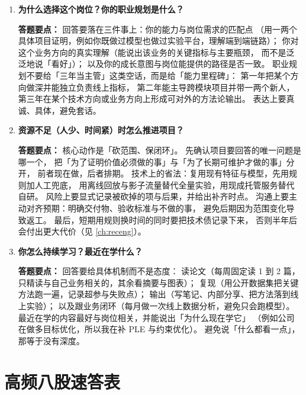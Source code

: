 \begin{interview}[题库与答题要点]
\begin{enumerate}[label=]
  \item[\textcolor{VioletDeep}{\textbf{Q142.}}] \textbf{为什么选择这个岗位？你的职业规划是什么？}
\par\smallskip\noindent\textcolor{VioletDeep}{\textbf{答题要点：}}
回答要落在三件事上：你的能力与岗位需求的匹配点
（用一两个具体项目证明，例如你既做过模型也做过实验平台，理解端到端链路）；
你对这个业务方向的真实理解（能说出该业务的关键指标与主要瓶颈，
而不是泛泛地说「看好」）；
以及你的成长意图与岗位能提供的路径是否一致。
职业规划不要给「三年当主管」这类空话，而是给「能力里程碑」：
第一年把某个方向做深并能独立负责线上指标，
第二年能主导跨模块项目并带一两个新人，
第三年在某个技术方向或业务方向上形成可对外的方法论输出。
表达上要真诚、具体，避免套话。

  \item[\textcolor{VioletDeep}{\textbf{Q143.}}] \textbf{资源不足（人少、时间紧）时怎么推进项目？}
\par\smallskip\noindent\textcolor{VioletDeep}{\textbf{答题要点：}}
核心动作是「砍范围、保闭环」。
先确认项目要回答的唯一问题是哪一个，
把「为了证明价值必须做的事」与「为了长期可维护才做的事」分开，
前者现在做，后者排期。
技术上的省法：复用现有特征与模型，先用规则加人工兜底，
用离线回放与影子流量替代全量实验，用现成托管服务替代自研。
风险上要显式记录被砍掉的项与后果，并给出补齐时点。
沟通上要主动对齐预期：明确交付物、验收标准与不做的事，
避免后期因为范围变化导致返工。
最后，短期用规则换时间的同时要把技术债记录下来，
否则半年后会付出更大代价（见 \cref{ch:receng}）。

  \item[\textcolor{VioletDeep}{\textbf{Q144.}}] \textbf{你怎么持续学习？最近在学什么？}
\par\smallskip\noindent\textcolor{VioletDeep}{\textbf{答题要点：}}
回答要给具体机制而不是态度：
读论文（每周固定读 1 到 2 篇，只精读与自己业务相关的，其余看摘要与图表）；
复现（用公开数据集把关键方法跑一遍，记录超参与失败点）；
输出（写笔记、内部分享、把方法落到线上实验）；
以及跟业务闭环（每月做一次线上数据分析，避免只会跑模型）。
最近在学的内容最好与岗位相关，并能说出「为什么现在学它」
（例如公司在做多目标优化，所以我在补 PLE 与约束优化）。
避免说「什么都看一点」，那等于没有深度。

\end{enumerate}

\end{interview}

\section{高频八股速答表}

